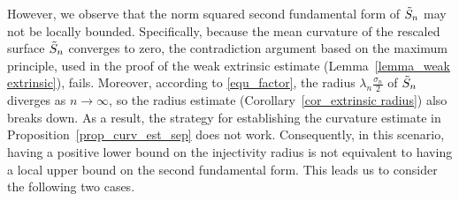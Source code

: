 \documentclass[12pt,a4paper]{amsart}
\numberwithin{equation}{section}
\theoremstyle{plain}
\theoremstyle{named}
\theoremstyle{definition}
\begin{document}
    However, we observe that the norm squared second fundamental form of $\Tilde{S}_n$ may not be locally bounded. Specifically, because the mean curvature of the rescaled surface $\Tilde{S}_n$ converges to zero, the contradiction argument based on the maximum principle, used in the proof of the weak extrinsic estimate (Lemma~\ref{lemma_weak extrinsic}), fails. Moreover, according to \eqref{equ_factor}, the radius $\lambda_n\frac{\sigma_n}{2}$ of $\Tilde{S}_n$ diverges as $n\rightarrow\infty$, so the radius estimate (Corollary~\ref{cor_extrinsic radius}) also breaks down. As a result, the strategy for establishing the curvature estimate in Proposition~\ref{prop_curv_est_sep} does not work. Consequently, in this scenario, having a positive lower bound on the injectivity radius is not equivalent to having a local upper bound on the second fundamental form. This leads us to consider the following two cases.
\end{document}
